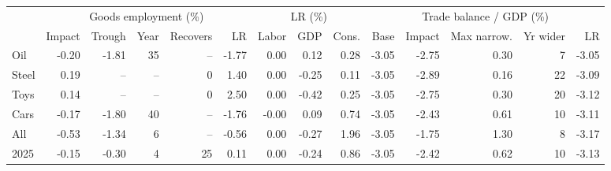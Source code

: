 \begin{tabular}{lrrrrrrrrrrrrr}
\toprule
 & \multicolumn{5}{c}{Goods employment (\%)} & \multicolumn{3}{c}{LR (\%)} & \multicolumn{5}{c}{Trade balance / GDP (\%)} \\
\cmidrule(lr){2-6}\cmidrule(lr){7-9}\cmidrule(lr){10-14}
 & Impact & Trough & Year & Recovers & LR & Labor & GDP & Cons. & Base & Impact & Max narrow. & Yr wider & LR \\
\midrule
Oil & -0.20 & -1.81 & 35 & -- & -1.77 & 0.00 & 0.12 & 0.28 & -3.05 & -2.75 & 0.30 & 7 & -3.05 \\
Steel & 0.19 & -- & -- & 0 & 1.40 & 0.00 & -0.25 & 0.11 & -3.05 & -2.89 & 0.16 & 22 & -3.09 \\
Toys & 0.14 & -- & -- & 0 & 2.50 & 0.00 & -0.42 & 0.25 & -3.05 & -2.75 & 0.30 & 20 & -3.12 \\
Cars & -0.17 & -1.80 & 40 & -- & -1.76 & -0.00 & 0.09 & 0.74 & -3.05 & -2.43 & 0.61 & 10 & -3.11 \\
All & -0.53 & -1.34 & 6 & -- & -0.56 & 0.00 & -0.27 & 1.96 & -3.05 & -1.75 & 1.30 & 8 & -3.17 \\
2025 & -0.15 & -0.30 & 4 & 25 & 0.11 & 0.00 & -0.24 & 0.86 & -3.05 & -2.42 & 0.62 & 10 & -3.13 \\
\bottomrule
\end{tabular}

